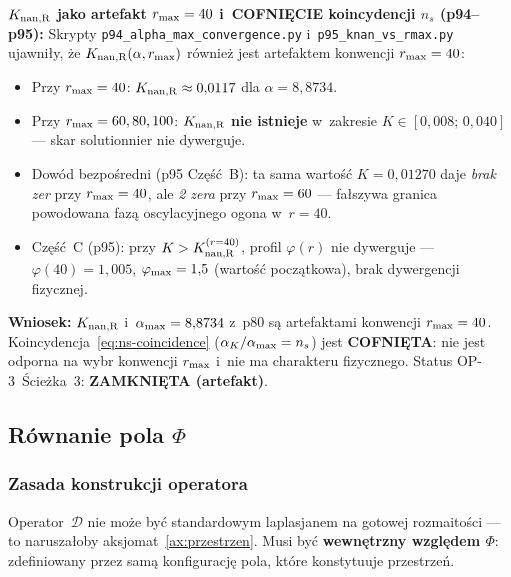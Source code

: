 \begin{remark}
\medskip
\textbf{$K_{\rm nan,R}$ jako artefakt $r_{\rm max}=40$ i~COFNI\k{E}CIE koincydencji $n_s$ (p94--p95):}
Skrypty \texttt{p94\_alpha\_max\_convergence.py} i~\texttt{p95\_knan\_vs\_rmax.py}
ujawni\l{}y, \.ze $K_{\rm nan,R}(\alpha, r_{\rm max})$ r\'ownie\.z jest
artefaktem konwencji $r_{\rm max}=40$:
\begin{itemize}[nosep]
\item Przy $r_{\rm max}=40$: $K_{\rm nan,R} \approx 0{,}0117$ dla $\alpha=8{,}8734$.
\item Przy $r_{\rm max}=60, 80, 100$: $K_{\rm nan,R}$ \textbf{nie istnieje}
  w~zakresie $K \in [0{,}008;\,0{,}040]$ --- skar solutionnier nie dywerguje.
\item Dow\'od bezpo\'sredni (p95 Cz\k{e}\'s\'c~B): ta sama warto\'s\'c
  $K=0{,}01270$ daje \emph{brak zer} przy $r_{\rm max}=40$,
  ale \emph{2 zera} przy $r_{\rm max}=60$ --- fa\l{}szywa granica
  powodowana faz\k{a} oscylacyjnego ogona w~$r=40$.
\item Cz\k{e}\'s\'c~C (p95): przy $K>K_{\rm nan,R}^{(r=40)}$, profil
  $\varphi(r)$ nie dywerguje --- $\varphi(40)=1{,}005$, $\varphi_{\rm max}=1{,}5$
  (warto\'s\'c pocz\k{a}tkowa), brak dywergencji fizycznej.
\end{itemize}
\textbf{Wniosek:} $K_{\rm nan,R}$ i~$\alpha_{\rm max}=8{,}8734$ z~p80 s\k{a}
artefaktami konwencji $r_{\rm max}=40$.
Koincydencja~\eqref{eq:ns-coincidence} ($\alpha_K/\alpha_{\rm max}=n_s$)
jest \textbf{COFNI\k{E}TA}: nie jest odporna na wybr konwencji
$r_{\rm max}$ i~nie ma charakteru fizycznego.
Status OP-3~\'Scie\.zka~3: \textbf{ZAMKNI\k{E}TA (artefakt)}.
\end{remark}

\subsection{R\'ownanie pola $\Phi$}\label{ssec:rownanko}

\subsubsection{Zasada konstrukcji operatora}

Operator~$\mathcal{D}$ nie mo\.ze by\'c standardowym laplasjanem
na gotowej rozmaito\'sci --- to narusza\l{}oby aksjomat~\ref{ax:przestrzen}.
Musi by\'c \textbf{wewn\k{e}trzny wzgl\k{e}dem $\Phi$}:
zdefiniowany przez sam\k{a} konfiguracj\k{e} pola, kt\'ore
konstytuuje przestrze\'n.

